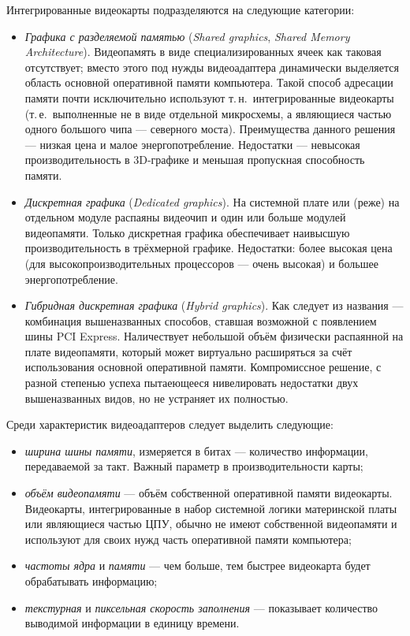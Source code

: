 Интегрированные видеокарты подразделяются на следующие категории:
\begin{itemize}
 \item \emph{Графика с разделяемой памятью} (\emph{Shared graphics}, \emph{Shared Memory Architecture}).
  Видеопамять в виде специализированных ячеек как таковая отсутствует; вместо этого под нужды видеоадаптера динамически выделяется область основной оперативной памяти компьютера.
  Такой способ адресации памяти почти исключительно используют т.\,н.~интегрированные видеокарты (т.\,е.~выполненные не в виде отдельной микросхемы, а являющиеся частью одного большого чипа --- северного моста).
  Преимущества данного решения --- низкая цена и малое энергопотребление.
  Недостатки --- невысокая производительность в 3D-графике и меньшая пропускная способность памяти.
 \item \emph{Дискретная графика} (\emph{Dedicated graphics}).
  На системной плате или (реже) на отдельном модуле распаяны видеочип и один или больше модулей видеопамяти.
  Только дискретная графика обеспечивает наивысшую производительность в трёхмерной графике.
  Недостатки: более высокая цена (для высокопроизводительных процессоров --- очень высокая) и большее энергопотребление.
 \item \emph{Гибридная дискретная графика} (\emph{Hybrid graphics}).
  Как следует из названия --- комбинация вышеназванных способов, ставшая возможной с появлением шины PCI Express.
  Наличествует небольшой объём физически распаянной на плате видеопамяти, который может виртуально расширяться за счёт использования основной оперативной памяти.
  Компромиссное решение, с разной степенью успеха пытаеющееся нивелировать недостатки двух вышеназванных видов, но не устраняет их полностью.
\end{itemize}

Среди характеристик видеоадаптеров следует выделить следующие:
\begin{itemize}
 \item \emph{ширина шины памяти}, измеряется в битах --- количество информации, передаваемой за такт.
  Важный параметр в производительности карты;
 \item \emph{объём видеопамяти} --- объём собственной оперативной памяти видеокарты.
  Видеокарты, интегрированные в набор системной логики материнской платы или являющиеся частью ЦПУ, обычно не имеют собственной видеопамяти и используют для своих нужд часть оперативной памяти компьютера;
 \item \emph{частоты ядра} и \emph{памяти} --- чем больше, тем быстрее видеокарта будет обрабатывать информацию;
 \item \emph{текстурная} и \emph{пиксельная скорость заполнения} --- показывает количество выводимой информации в единицу времени.
\end{itemize}

